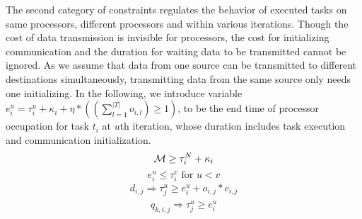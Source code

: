 
The second category of constraints regulates the behavior of executed tasks on same processors, different processors and within various iterations. Though the cost of data transmission is invisible for processors,  %
the cost for initializing communication and the duration for waiting data to be transmitted cannot be ignored. As we assume that data from one source can be transmitted to different destinations simultaneously, transmitting data from the same source only needs one initializing. In the following, we introduce variable $e^u_i=\tau^u_i+\kappa_i + \eta*((\sum^{|T|}_{l=1} o_{i,l})\geq 1)$, to be the end time of processor occupation for task $t_i$ at $u$th iteration, whose duration includes task execution and communication initialization.
	\begin{equation}\label{eq:6}
		{\cal{M}}\geq \tau^N_{i}+\kappa_i
	\end{equation}
	\begin{equation}\label{eq:10}
		 e^u_i \leq \tau^{v}_{i} \textrm{ for } u<v
	\end{equation}
	\begin{equation}\label{eq:7}
	\begin{array}{l}
		d_{i,j}\Rightarrow \tau^u_{j} \geq e^u_i+  o_{i,j}* c_{i,j} 
	\end{array}	
	\end{equation}
	\begin{equation}\label{eq:8}
	\begin{array}{l}
		q_{k,i,j} \Rightarrow \tau^u_j \geq e^u_i
	\end{array}
	\end{equation}
